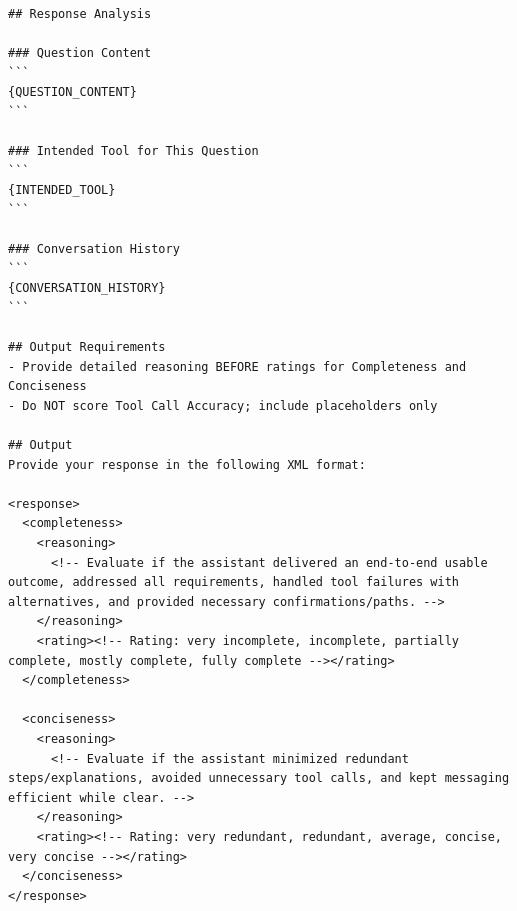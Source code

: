 \begin{verbatim}
## Response Analysis

### Question Content
```
{QUESTION_CONTENT}
```

### Intended Tool for This Question
```
{INTENDED_TOOL}
```

### Conversation History
```
{CONVERSATION_HISTORY}
```

## Output Requirements
- Provide detailed reasoning BEFORE ratings for Completeness and Conciseness
- Do NOT score Tool Call Accuracy; include placeholders only

## Output
Provide your response in the following XML format:

<response>
  <completeness>
    <reasoning>
      <!-- Evaluate if the assistant delivered an end-to-end usable outcome, addressed all requirements, handled tool failures with alternatives, and provided necessary confirmations/paths. -->
    </reasoning>
    <rating><!-- Rating: very incomplete, incomplete, partially complete, mostly complete, fully complete --></rating>
  </completeness>

  <conciseness>
    <reasoning>
      <!-- Evaluate if the assistant minimized redundant steps/explanations, avoided unnecessary tool calls, and kept messaging efficient while clear. -->
    </reasoning>
    <rating><!-- Rating: very redundant, redundant, average, concise, very concise --></rating>
  </conciseness>
</response>
\end{verbatim}
